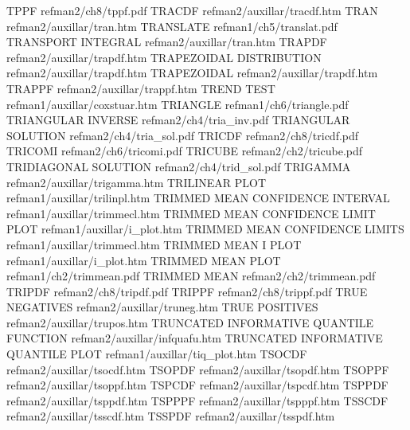 TPPF                                    refman2/ch8/tppf.pdf
TRACDF                                  refman2/auxillar/tracdf.htm
TRAN                                    refman2/auxillar/tran.htm
TRANSLATE                               refman1/ch5/translat.pdf
TRANSPORT INTEGRAL                      refman2/auxillar/tran.htm
TRAPDF                                  refman2/auxillar/trapdf.htm
TRAPEZOIDAL DISTRIBUTION                refman2/auxillar/trapdf.htm
TRAPEZOIDAL                             refman2/auxillar/trapdf.htm
TRAPPF                                  refman2/auxillar/trappf.htm
TREND TEST                              refman1/auxillar/coxstuar.htm
TRIANGLE                                refman1/ch6/triangle.pdf
TRIANGULAR INVERSE                      refman2/ch4/tria_inv.pdf
TRIANGULAR SOLUTION                     refman2/ch4/tria_sol.pdf
TRICDF                                  refman2/ch8/tricdf.pdf
TRICOMI                                 refman2/ch6/tricomi.pdf
TRICUBE                                 refman2/ch2/tricube.pdf
TRIDIAGONAL SOLUTION                    refman2/ch4/trid_sol.pdf
TRIGAMMA                                refman2/auxillar/trigamma.htm
TRILINEAR PLOT                          refman1/auxillar/trilinpl.htm
TRIMMED MEAN CONFIDENCE INTERVAL        refman1/auxillar/trimmecl.htm
TRIMMED MEAN CONFIDENCE LIMIT PLOT      refman1/auxillar/i_plot.htm
TRIMMED MEAN CONFIDENCE LIMITS          refman1/auxillar/trimmecl.htm
TRIMMED MEAN I PLOT                     refman1/auxillar/i_plot.htm
TRIMMED MEAN PLOT                       refman1/ch2/trimmean.pdf
TRIMMED MEAN                            refman2/ch2/trimmean.pdf
TRIPDF                                  refman2/ch8/tripdf.pdf
TRIPPF                                  refman2/ch8/trippf.pdf
TRUE NEGATIVES                          refman2/auxillar/truneg.htm
TRUE POSITIVES                          refman2/auxillar/trupos.htm
TRUNCATED INFORMATIVE QUANTILE FUNCTION refman2/auxillar/infquafu.htm
TRUNCATED INFORMATIVE QUANTILE PLOT     refman1/auxillar/tiq_plot.htm
TSOCDF                                  refman2/auxillar/tsocdf.htm
TSOPDF                                  refman2/auxillar/tsopdf.htm
TSOPPF                                  refman2/auxillar/tsoppf.htm
TSPCDF                                  refman2/auxillar/tspcdf.htm
TSPPDF                                  refman2/auxillar/tsppdf.htm
TSPPPF                                  refman2/auxillar/tspppf.htm
TSSCDF                                  refman2/auxillar/tsscdf.htm
TSSPDF                                  refman2/auxillar/tsspdf.htm
